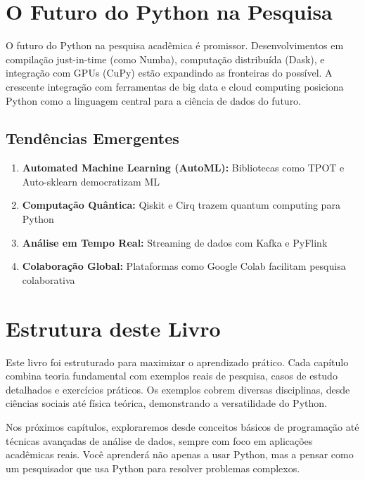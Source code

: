 \section{O Futuro do Python na Pesquisa}

O futuro do Python na pesquisa acadêmica é promissor. Desenvolvimentos em compilação just-in-time (como Numba), computação distribuída (Dask), e integração com GPUs (CuPy) estão expandindo as fronteiras do possível. A crescente integração com ferramentas de big data e cloud computing posiciona Python como a linguagem central para a ciência de dados do futuro.

\subsection{Tendências Emergentes}

\begin{enumerate}
    \item \textbf{Automated Machine Learning (AutoML):} Bibliotecas como TPOT e Auto-sklearn democratizam ML
    \item \textbf{Computação Quântica:} Qiskit e Cirq trazem quantum computing para Python
    \item \textbf{Análise em Tempo Real:} Streaming de dados com Kafka e PyFlink
    \item \textbf{Colaboração Global:} Plataformas como Google Colab facilitam pesquisa colaborativa
\end{enumerate}

\section{Estrutura deste Livro}

Este livro foi estruturado para maximizar o aprendizado prático. Cada capítulo combina teoria fundamental com exemplos reais de pesquisa, casos de estudo detalhados e exercícios práticos. Os exemplos cobrem diversas disciplinas, desde ciências sociais até física teórica, demonstrando a versatilidade do Python.

Nos próximos capítulos, exploraremos desde conceitos básicos de programação até técnicas avançadas de análise de dados, sempre com foco em aplicações acadêmicas reais. Você aprenderá não apenas a usar Python, mas a pensar como um pesquisador que usa Python para resolver problemas complexos.


